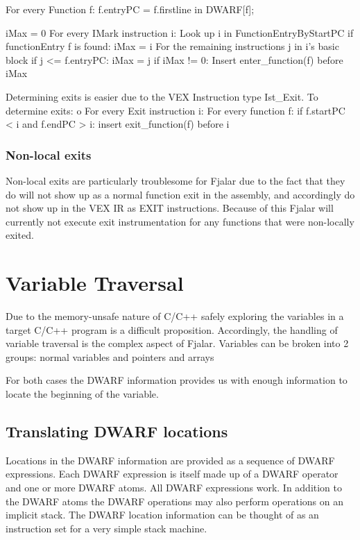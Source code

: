 \documentclass[11pt]{article}
\begin{document}
\begin{program}
For every Function f:
  f.entryPC = f.firstline in DWARF[f];

iMax = 0
For every IMark instruction i:
  Look up i in FunctionEntryByStartPC 
  if functionEntry f is found:
    iMax = i
    For the remaining instructions j in i's basic block
      if j <= f.entryPC: 
        iMax = j
if iMax != 0:
  Insert enter\_function(f) before iMax

Determining exits is easier due to the VEX Instruction type
Ist\_Exit. To determine exits:
o
For every Exit instruction i:
  For every function f:
     if f.startPC < i and f.endPC > i:
        insert exit\_function(f) before i
\end{program}

\subsubsection{Non-local exits}
Non-local exits are particularly troublesome for Fjalar due to the
fact that they do will not show up as a normal function exit in the
assembly, and accordingly do not show up in the VEX IR as EXIT
instructions. Because of this Fjalar will currently not execute exit
instrumentation for any functions that were non-locally exited.

\section{Variable Traversal}
Due to the memory-unsafe nature of C/C++ safely exploring the
variables in a target C/C++ program is a difficult
proposition. Accordingly, the handling of variable traversal is the
complex aspect of Fjalar. Variables can be broken into 2 groups:
normal variables %
and pointers and arrays

For both cases the DWARF information provides us with enough
information to locate the beginning of the variable.

\subsection{Translating DWARF locations}
Locations in the DWARF information are provided as a sequence of
DWARF expressions. Each DWARF expression is itself made up of a DWARF
operator and one or more DWARF atoms. All DWARF expressions work. In
addition to the DWARF atoms the DWARF operations may also perform
operations on an implicit stack. The DWARF location information can be
thought of as an instruction set for a very simple stack machine.
\end{document}
